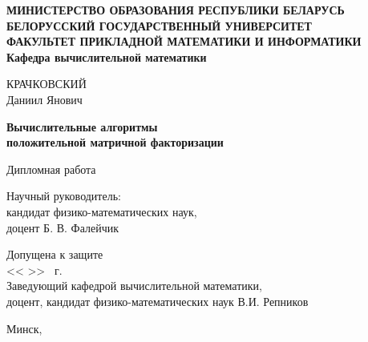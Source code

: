 \begin{titlepage}

  \begin{center}
    \textbf{МИНИСТЕРСТВО ОБРАЗОВАНИЯ РЕСПУБЛИКИ БЕЛАРУСЬ} \\
    \textbf{БЕЛОРУССКИЙ ГОСУДАРСТВЕННЫЙ УНИВЕРСИТЕТ} \\
    \textbf{ФАКУЛЬТЕТ ПРИКЛАДНОЙ МАТЕМАТИКИ И ИНФОРМАТИКИ} \\
    \textbf{Кафедра вычислительной математики}
  \end{center}

  \vfill

  \begin{center}
    КРАЧКОВСКИЙ \\
    Даниил Янович
  \end{center}

  \begin{center}
    \textbf{Вычислительные алгоритмы} \\
    \textbf{положительной матричной факторизации}
  \end{center}

  \vspace{2.5em}

  \begin{center}
    Дипломная работа
  \end{center}

  \vfill

  \begin{flushright}
    \begin{minipage}{0.5 \linewidth}
      Научный руководитель: \\
      кандидат физико-математических наук, \\
      доцент Б. В. Фалейчик
    \end{minipage}
  \end{flushright}

  \vspace{1cm}

  \begin{flushleft}
    Допущена к защите \\
    << \underline{\hspace{1cm}} >> \underline{\hspace{3cm}} \the\year \ г. \\
    Заведующий кафедрой вычислительной математики, \\
    доцент, кандидат физико-математических наук В.И. Репников
  \end{flushleft}

  \vspace{0.5cm}

  \begin{center}
    Минск, \the\year
  \end{center}

\end{titlepage}
